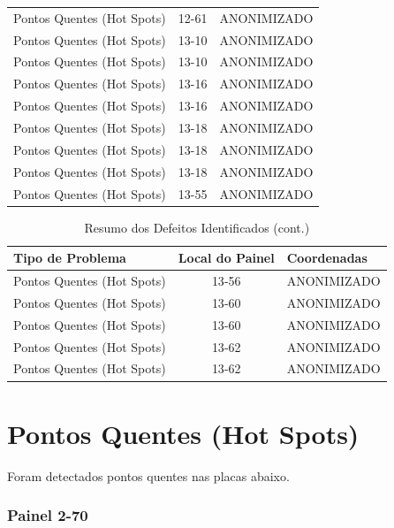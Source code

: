 \documentclass[dvipsnames]{article}%
\begin{document}
\begin{table}[h!]
\begin{tabular}{lcl}
Pontos Quentes (Hot Spots)&12{-}61&ANONIMIZADO\\%
Pontos Quentes (Hot Spots)&13{-}10&ANONIMIZADO\\%
Pontos Quentes (Hot Spots)&13{-}10&ANONIMIZADO\\%
Pontos Quentes (Hot Spots)&13{-}16&ANONIMIZADO\\%
Pontos Quentes (Hot Spots)&13{-}16&ANONIMIZADO\\%
Pontos Quentes (Hot Spots)&13{-}18&ANONIMIZADO\\%
Pontos Quentes (Hot Spots)&13{-}18&ANONIMIZADO\\%
Pontos Quentes (Hot Spots)&13{-}18&ANONIMIZADO\\%
Pontos Quentes (Hot Spots)&13{-}55&ANONIMIZADO\\%
\bottomrule%
\end{tabular}%
\end{table}

%
\FloatBarrier%


\begin{table}[h!]%
\caption{Resumo dos Defeitos Identificados (cont.)}%
\centering%
\begin{tabular}{lcl}%
\toprule%
Tipo de Problema&Local do Painel&Coordenadas\\%
\midrule%
Pontos Quentes (Hot Spots)&13{-}56&ANONIMIZADO\\%
Pontos Quentes (Hot Spots)&13{-}60&ANONIMIZADO\\%
Pontos Quentes (Hot Spots)&13{-}60&ANONIMIZADO\\%
Pontos Quentes (Hot Spots)&13{-}62&ANONIMIZADO\\%
Pontos Quentes (Hot Spots)&13{-}62&ANONIMIZADO\\%
\bottomrule%
\end{tabular}%
\end{table}

%
\FloatBarrier%
\newpage%
\section{Pontos Quentes (Hot Spots)}%
Foram detectados pontos quentes nas placas abaixo.\newline%
%
\subsubsection{Painel 2-70}%
\end{document}
